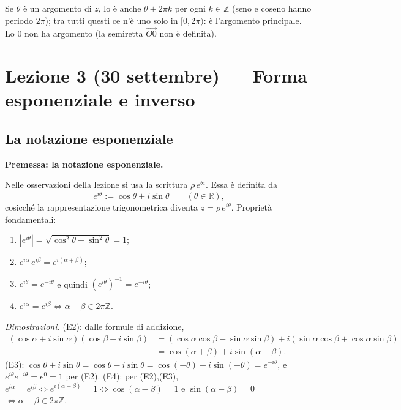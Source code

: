 \documentclass[11pt,a4paper]{article}
\newcommand{\RR}{\mathbb{R}}
\newcommand{\ZZ}{\mathbb{Z}}
\theoremstyle{plain}
\theoremstyle{definition}
\theoremstyle{remark}
\begin{document}
Se $\theta$ è un argomento di $z$, lo è anche $\theta+2\pi k$ per ogni $k\in\ZZ$ (seno e coseno hanno periodo $2\pi$);
tra tutti questi ce n'è uno solo in $[0,2\pi)$: è l'argomento principale.
Lo $0$ non ha argomento (la semiretta $\overrightarrow{O0}$ non è definita).
\par\medskip

\section{Lezione 3 (30 settembre) --- Forma esponenziale e inverso}

\subsection{La notazione esponenziale}

\par\medskip
\noindent\textbf{Premessa: la notazione esponenziale.}\par

Nelle osservazioni della lezione si usa la scrittura $\rho\,e^{\theta i}$. Essa è definita da
\[
  e^{i\theta}:=\cos\theta+i\sin\theta\qquad(\theta\in\RR),
\]
cosicché la rappresentazione trigonometrica diventa $z=\rho\,e^{i\theta}$. Proprietà fondamentali:
\begin{enumerate}[label=(E\arabic*)]
  \item $|e^{i\theta}|=\sqrt{\cos^2\theta+\sin^2\theta}=1$;
  \item $e^{i\alpha}\,e^{i\beta}=e^{i(\alpha+\beta)}$;
  \item $\overline{e^{i\theta}}=e^{-i\theta}$ e quindi $(e^{i\theta})^{-1}=e^{-i\theta}$;
  \item $e^{i\alpha}=e^{i\beta}\iff\alpha-\beta\in2\pi\ZZ$.
\end{enumerate}
\emph{Dimostrazioni.}
(E2): dalle formule di addizione,
\begin{align*}
(\cos\alpha+i\sin\alpha)(\cos\beta+i\sin\beta)
 &=(\cos\alpha\cos\beta-\sin\alpha\sin\beta)+i(\sin\alpha\cos\beta+\cos\alpha\sin\beta)\\
 &=\cos(\alpha+\beta)+i\sin(\alpha+\beta).
\end{align*}
(E3): $\overline{\cos\theta+i\sin\theta}=\cos\theta-i\sin\theta=\cos(-\theta)+i\sin(-\theta)=e^{-i\theta}$, e
$e^{i\theta}e^{-i\theta}=e^{0}=1$ per (E2).
(E4): per (E2),(E3), $e^{i\alpha}=e^{i\beta}\iff e^{i(\alpha-\beta)}=1\iff\cos(\alpha-\beta)=1$ e $\sin(\alpha-\beta)=0$
$\iff\alpha-\beta\in2\pi\ZZ$.
\par\medskip
\end{document}
